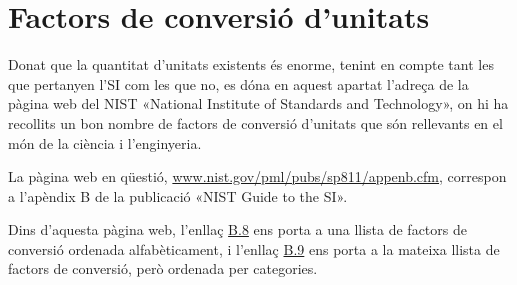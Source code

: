 \section{Factors de conversió d'unitats}
Donat que la quantitat d'unitats existents és enorme, tenint en compte tant les que pertanyen l'SI com les que no, es dóna en aquest apartat l'adreça de la pàgina web del NIST «National Institute of Standards and Technology», on hi ha recollits un bon nombre de factors de conversió d'unitats que són rellevants en el món de la ciència i l'enginyeria.

La pàgina web en  qüestió, \href{http://www.nist.gov/pml/pubs/sp811/appenb.cfm}{www.nist.gov/pml/pubs/sp811/appenb.cfm}, correspon a l'apèndix B de la publicació «NIST Guide to the SI».

Dins d'aquesta pàgina web, l'enllaç \href{http://www.nist.gov/pml/pubs/sp811/appenb8.cfm}{B.8} ens porta a una llista de factors de conversió ordenada alfabèticament, i l'enllaç  \href{http://www.nist.gov/pml/pubs/sp811/appenb9.cfm}{B.9} ens porta a la mateixa llista de factors de conversió, però ordenada per categories. 